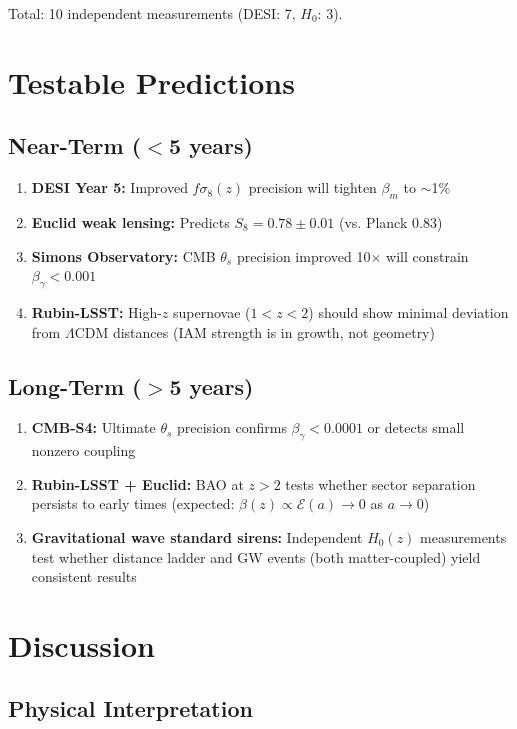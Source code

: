 \documentclass[twocolumn,superscriptaddress,prl,amsmath,amssymb]{revtex4-2}
\begin{document}
Total: 10 independent measurements (DESI: 7, $H_0$: 3).

\section{Testable Predictions}

\subsection{Near-Term ($<$5 years)}

\begin{enumerate}
\item \textbf{DESI Year 5:} Improved $f\sigma_8(z)$ precision will tighten $\beta_m$ to $\sim$1\%
\item \textbf{Euclid weak lensing:} Predicts $S_8 = 0.78 \pm 0.01$ (vs. Planck 0.83)
\item \textbf{Simons Observatory:} CMB $\theta_s$ precision improved 10$\times$ will constrain $\beta_\gamma < 0.001$
\item \textbf{Rubin-LSST:} High-$z$ supernovae ($1 < z < 2$) should show minimal deviation from $\Lambda$CDM distances (IAM strength is in growth, not geometry)
\end{enumerate}

\subsection{Long-Term ($>$5 years)}

\begin{enumerate}
\item \textbf{CMB-S4:} Ultimate $\theta_s$ precision confirms $\beta_\gamma < 0.0001$ or detects small nonzero coupling
\item \textbf{Rubin-LSST + Euclid:} BAO at $z > 2$ tests whether sector separation persists to early times (expected: $\beta(z) \propto \mathcal{E}(a) \to 0$ as $a \to 0$)
\item \textbf{Gravitational wave standard sirens:} Independent $H_0(z)$ measurements test whether distance ladder and GW events (both matter-coupled) yield consistent results
\end{enumerate}

\section{Discussion}

\subsection{Physical Interpretation}
\end{document}
